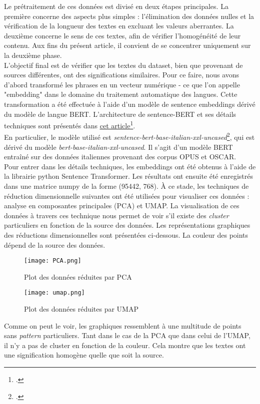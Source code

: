 Le prétraitement de ces données est divisé en deux étapes principales. La première concerne des aspects plus simples : l'élimination des données nulles et la vérification de la longueur des textes en excluant les valeurs aberrantes. La deuxième concerne le sens de ces textes, afin de vérifier l'homogénéité de leur contenu. Aux fins du présent article, il convient de se concentrer uniquement sur la deuxième phase.
\\

L'objectif final est de vérifier que les textes du dataset, bien que provenant de sources différentes, ont des significations similaires. Pour ce faire, nous avons d'abord transformé les phrases en un vecteur numérique - ce que l'on appelle "embedding" dans le domaine du traitement automatique des langues. Cette transformation a été effectuée à l'aide d'un modèle de sentence embeddings dérivé du modèle de langue BERT. L'architecture de sentence-BERT et ses détails techniques sont présentés dans \underline{\href{https://arxiv.org/abs/1908.10084}{cet article}}\footcite{reimers2019}.  \\
En particulier, le modèle utilisé est \emph{sentence-bert-base-italian-xxl-uncased}\footcite{sentenceBERT2024}, qui est dérivé du modèle \emph{bert-base-italian-xxl-uncased}. Il s'agit d'un modèle BERT entraîné sur des données italiennes provenant des corpus OPUS et OSCAR. \\

Pour entrer dans les détails techniques, les embeddings ont été obtenus à l'aide de la librairie python Sentence Transformer. Les résultats ont ensuite été enregistrés dans une matrice numpy de la forme (95442, 768). À ce stade, les techniques de réduction dimensionnelle suivantes ont été utilisées pour visualiser ces données : analyse en composantes principales (PCA) et UMAP. La visualisation de ces données à travers ces technique nous permet de voir s'il existe des \emph{cluster} particuliers en fonction de la source des données. Les représentations graphiques des réductions dimensionnelles sont présentées ci-dessous. La couleur des points dépend de la source des données.

\begin{figure}[h!]
	\texttt{[image: PCA.png]}
	\centering
	\caption{Plot des données réduites par PCA}
\end{figure}

\begin{figure}[h!]
	\texttt{[image: umap.png]}
	\centering
	\caption{Plot des données réduites par UMAP}
\end{figure}

\clearpage

Comme on peut le voir, les graphiques ressemblent à une multitude de points sans \emph{pattern} particuliers. Tant dans le cas de la PCA que dans celui de l'UMAP, il n'y a pas de cluster en fonction de la couleur. Cela montre que les textes ont une signification homogène quelle que soit la source.